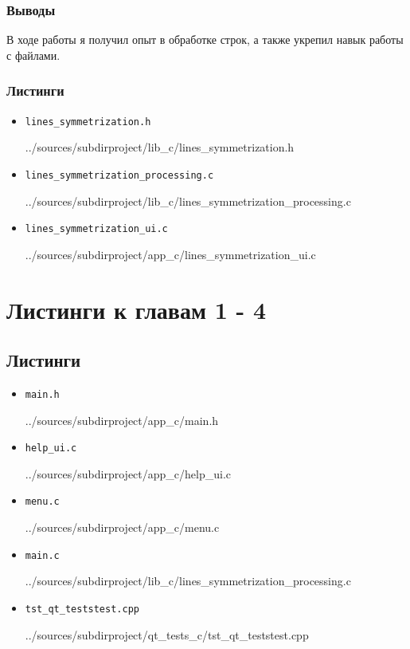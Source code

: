 \documentclass[12pt,a4paper]{report}
\begin{document}
\subsection{Выводы}
\hspace{\parindent}
В ходе работы я получил опыт в обработке строк, а также укрепил навык работы с файлами.
\subsection*{Листинги}
\begin{itemize}
\item[] \verb-lines_symmetrization.h-

{../sources/subdirproject/lib_c/lines_symmetrization.h}
\item[] \verb-lines_symmetrization_processing.c-

{../sources/subdirproject/lib_c/lines_symmetrization_processing.c}
\item[] \verb-lines_symmetrization_ui.c-

{../sources/subdirproject/app_c/lines_symmetrization_ui.c}
\end{itemize}
%

\chapter{Листинги к главам 1 - 4}

\section{Листинги}
\begin{itemize}
\item[] \verb-main.h-

{../sources/subdirproject/app_c/main.h}

\item[] \verb-help_ui.c-

{../sources/subdirproject/app_c/help_ui.c}

\item[] \verb-menu.c-

{../sources/subdirproject/app_c/menu.c}

\item[] \verb-main.c-

{../sources/subdirproject/lib_c/lines_symmetrization_processing.c}

\item[] \verb-tst_qt_teststest.cpp-

{../sources/subdirproject/qt_tests_c/tst_qt_teststest.cpp}
\end{itemize}
%
\end{document}
